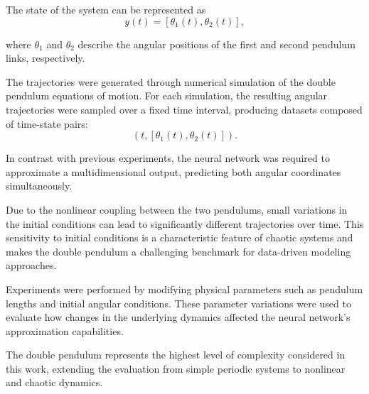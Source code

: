 The state of the system can be represented as
\begin{equation}
    y(t)=[\theta_1(t),\theta_2(t)],
\end{equation}

where $\theta_1$ and $\theta_2$ describe the angular positions of the first and second pendulum links, respectively.

The trajectories were generated through numerical simulation of the double pendulum equations of motion. For each simulation, the resulting angular trajectories were sampled over a fixed time interval, producing datasets composed of time-state pairs:
\begin{equation}
    (t,[\theta_1(t),\theta_2(t)]).
\end{equation}

In contrast with previous experiments, the neural network was required to approximate a multidimensional output, predicting both angular coordinates simultaneously.

Due to the nonlinear coupling between the two pendulums, small variations in the initial conditions can lead to significantly different trajectories over time. This sensitivity to initial conditions is a characteristic feature of chaotic systems \cite{strogatz2015nonlinear} and makes the double pendulum a challenging benchmark for data-driven modeling approaches.

Experiments were performed by modifying physical parameters such as pendulum lengths and initial angular conditions. These parameter variations were used to evaluate how changes in the underlying dynamics affected the neural network's approximation capabilities.

The double pendulum represents the highest level of complexity considered in this work, extending the evaluation from simple periodic systems to nonlinear and chaotic dynamics.

